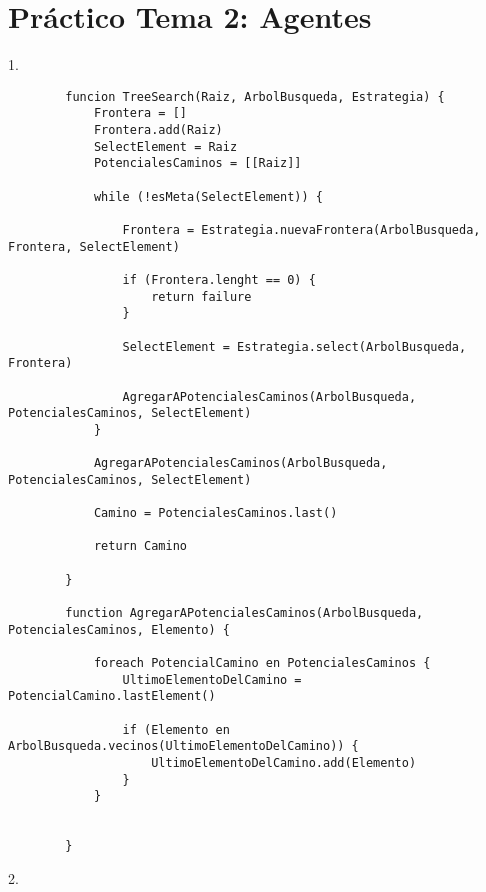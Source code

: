 \chapter{Práctico Tema 2: Agentes}


1.\\

\begin{center}
	\begin{lstlisting}
		funcion TreeSearch(Raiz, ArbolBusqueda, Estrategia) {
			Frontera = []
			Frontera.add(Raiz)
			SelectElement = Raiz
			PotencialesCaminos = [[Raiz]]
			
			while (!esMeta(SelectElement)) {
				
				Frontera = Estrategia.nuevaFrontera(ArbolBusqueda, Frontera, SelectElement)
				
				if (Frontera.lenght == 0) {
					return failure
				}
				
				SelectElement = Estrategia.select(ArbolBusqueda, Frontera)
				
				AgregarAPotencialesCaminos(ArbolBusqueda, PotencialesCaminos, SelectElement)
			}
		
			AgregarAPotencialesCaminos(ArbolBusqueda, PotencialesCaminos, SelectElement)
		
			Camino = PotencialesCaminos.last()
		
			return Camino
			
		}
	
		function AgregarAPotencialesCaminos(ArbolBusqueda, PotencialesCaminos, Elemento) {
			
			foreach PotencialCamino en PotencialesCaminos {
				UltimoElementoDelCamino = PotencialCamino.lastElement()
				
				if (Elemento en ArbolBusqueda.vecinos(UltimoElementoDelCamino)) {
					UltimoElementoDelCamino.add(Elemento)
				}
			}
				
			
		}
	\end{lstlisting}
\end{center}

2.\\

